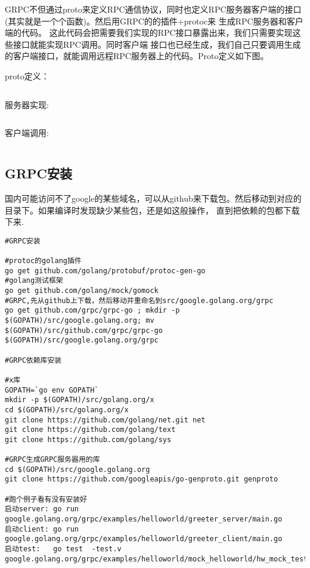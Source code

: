 GRPC不但通过proto来定义RPC通信协议，同时也定义RPC服务器客户端的接口(其实就是一个个函数)。然后用GRPC的的插件+protoc来
生成RPC服务器和客户端的代码。 这此代码会把需要我们实现的RPC接口暴露出来，我们只需要实现这些接口就能实现RPC调用。同时客户端
接口也已经生成，我们自己只要调用生成的客户端接口，就能调用远程RPC服务器上的代码。Proto定义如下图。

proto定义：
\inputminted[linenos,firstnumber=1, fontfamily=tt, baselinestretch=0.7, numberblanklines=false, style=vs,xleftmargin=10pt,breaklines,fontsize=\footnotesize]{proto}{source/grpc/helloworld/helloworld/helloworld.proto}


服务器实现:
\inputminted[linenos,firstnumber=1, fontfamily=tt, baselinestretch=0.7, numberblanklines=false, style=vs,xleftmargin=10pt,breaklines,fontsize=\footnotesize]{go}{source/grpc/helloworld/greeter_server/main.go}

客户端调用:
\inputminted[linenos,firstnumber=1, fontfamily=tt, baselinestretch=0.7, numberblanklines=false, style=vs,xleftmargin=10pt,breaklines,fontsize=\footnotesize]{go}{source/grpc/helloworld/greeter_client/main.go}


\subsection{GRPC安装}
国内可能访问不了google的某些域名，可以从github来下载包。然后移动到对应的目录下。如果编译时发现缺少某些包，还是如这般操作，
直到把依赖的包都下载下来.


\begin{verbatim}
#GRPC安装

#protoc的golang插件
go get github.com/golang/protobuf/protoc-gen-go 
#golang测试框架
go get github.com/golang/mock/gomock
#GRPC,先从github上下载，然后移动并重命名到src/google.golang.org/grpc
go get github.com/grpc/grpc-go ; mkdir -p $(GOPATH)/src/google.golang.org; mv $(GOPATH)/src/github.com/grpc/grpc-go $(GOPATH)/src/google.golang.org/grpc

#GRPC依赖库安装

#x库
GOPATH=`go env GOPATH`
mkdir -p $(GOPATH)/src/golang.org/x
cd $(GOPATH)/src/golang.org/x
git clone https://github.com/golang/net.git net
git clone https://github.com/golang/text
git clone https://github.com/golang/sys

#GRPC生成GRPC服务器用的库
cd $(GOPATH)/src/google.golang.org
git clone https://github.com/googleapis/go-genproto.git genproto

#跑个例子看有没有安装好
启动server: go run google.golang.org/grpc/examples/helloworld/greeter_server/main.go
启动client: go run google.golang.org/grpc/examples/helloworld/greeter_client/main.go
启动test:   go test  -test.v google.golang.org/grpc/examples/helloworld/mock_helloworld/hw_mock_test.go
\end{verbatim}
